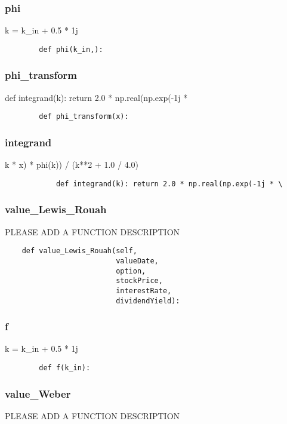 \documentclass[twoside,11pt]{book}
\begin{document}
\subsubsection*{{\bf phi}}
k = k\_in + 0.5 * 1j 

\begin{lstlisting}
        def phi(k_in,):
\end{lstlisting}

\subsubsection*{{\bf phi\_transform}}
def integrand(k): return 2.0 * np.real(np.exp(-1j * \ 

\begin{lstlisting}
        def phi_transform(x):
\end{lstlisting}

\subsubsection*{{\bf integrand}}
k * x) * phi(k)) / (k**2 + 1.0 / 4.0) 

\begin{lstlisting}
            def integrand(k): return 2.0 * np.real(np.exp(-1j * \
\end{lstlisting}

\subsubsection*{{\bf value\_Lewis\_Rouah}}
PLEASE ADD A FUNCTION DESCRIPTION

\begin{lstlisting}
    def value_Lewis_Rouah(self,
                          valueDate,
                          option,
                          stockPrice,
                          interestRate,
                          dividendYield):
\end{lstlisting}

\subsubsection*{{\bf f}}
k = k\_in + 0.5 * 1j 

\begin{lstlisting}
        def f(k_in):
\end{lstlisting}

\subsubsection*{{\bf value\_Weber}}
PLEASE ADD A FUNCTION DESCRIPTION
\end{document}
